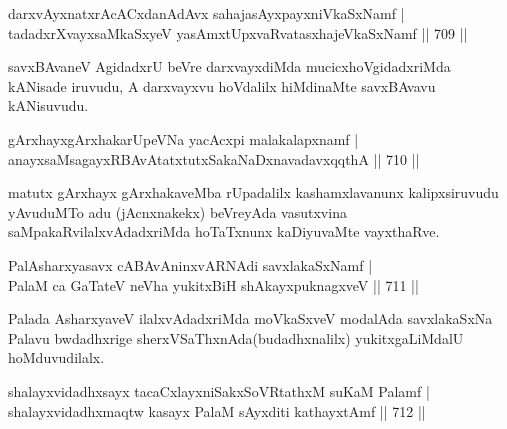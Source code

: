 
\begin{shl}
darxvAyxnatxrAcACxdanAdAvx sahajasAyxpayxniVkaSxNamf | \\
tadadxrXvayxsaMkaSxyeV yasAmxtUpxvaRvatasxhajeVkaSxNamf \hfill||  709 ||  
\end{shl}

\begin{artha}
savxBAvaneV AgidadxrU beVre darxvayxdiMda mucicxhoVgidadxriMda kANisade iruvudu, A darxvayxvu hoVdalilx hiMdinaMte savxBAvavu kANisuvudu.
\end{artha}


\begin{shl}
gArxhayxgArxhakarUpeVNa yacAcxpi malakalapxnamf | \\
anayxsaMsagayxRBAvAtatxtutxSakaNaDxnavadavxqqthA \hfill||  710 ||  
\end{shl}

\begin{artha}
matutx gArxhayx gArxhakaveMba rUpadalilx kashamxlavanunx kalipxsiruvudu yAvuduMTo adu (jAcnxnakekx) beVreyAda vasutxvina saMpakaRvilalxvAdadxriMda hoTaTxnunx kaDiyuvaMte vayxthaRve.
\end{artha}


\begin{shl}
PalAsharxyasavx cABAvAninxvARNAdi savxlakaSxNamf | \\
PalaM ca GaTateV neVha yukitxBiH shAkayxpuknagxveV \hfill||  711 ||  
\end{shl}

\begin{artha}
Palada AsharxyaveV ilalxvAdadxriMda moVkaSxveV modalAda savxlakaSxNa Palavu bwdadhxrige sherxVSaThxnAda(budadhxnalilx) yukitxgaLiMdalU hoMduvudilalx.
\end{artha}


\begin{shl}
shalayxvidadhxsayx tacaCxlayxniSakxSoVRtathxM suKaM Palamf | \\
shalayxvidadhxmaqtw kasayx PalaM sAyxditi kathayxtAmf \hfill||  712 ||  
\end{shl}

